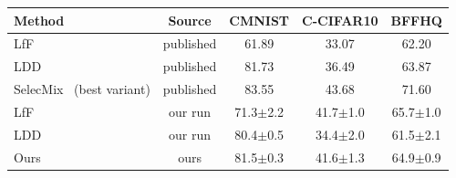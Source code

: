 \begin{tabular}{lcccc}
\toprule
Method & Source & CMNIST & C-CIFAR10 & BFFHQ \\
\midrule
LfF~\cite{nam2020lff} & published & 61.89 & 33.07 & 62.20 \\
LDD~\cite{lee2021ldd} & published & 81.73 & 36.49 & 63.87 \\
SelecMix~\cite{hwang2022selecmix} (best variant) & published & 83.55 & 43.68 & 71.60 \\
LfF & our run & 71.3{\scriptsize$\pm$2.2} & 41.7{\scriptsize$\pm$1.0} & 65.7{\scriptsize$\pm$1.0} \\
LDD & our run & 80.4{\scriptsize$\pm$0.5} & 34.4{\scriptsize$\pm$2.0} & 61.5{\scriptsize$\pm$2.1} \\
Ours & ours & 81.5{\scriptsize$\pm$0.3} & 41.6{\scriptsize$\pm$1.3} & 64.9{\scriptsize$\pm$0.9} \\
\bottomrule
\end{tabular}
